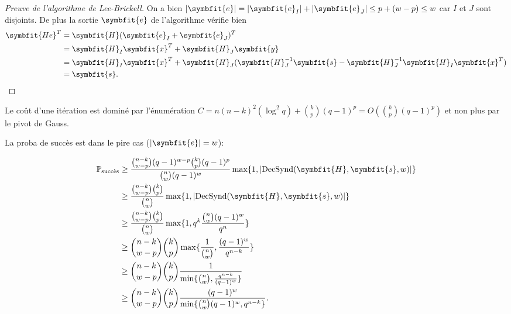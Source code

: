 \documentclass{scrartcl}[a4paper,9pt,headings=small,footinclude=false]
\theoremstyle{definition}
\theoremstyle{remark}
\begin{document}
\begin{proof}[Preuve de l'algorithme de Lee-Brickell]
On a bien $|\symbfit{e}|=|\symbfit{e}_I|+|\symbfit{e}_J|\leq p + (w - p)\leq w$ car $I$ et $J$ sont disjoints.
De plus la sortie $\symbfit{e}$ de l'algorithme vérifie bien
\begin{align*}
    \symbfit{He}^T &= \symbfit{H}(\symbfit{e}_I+\symbfit{e}_J)^T\\
    &= \symbfit{H}_I \symbfit{x}^T + \symbfit{H}_J \symbfit{y}\\
    &= \symbfit{H}_I \symbfit{x}^T + \symbfit{H}_J (\symbfit{H}_J^{-1}\symbfit{s} - \symbfit{H}_J^{-1}\symbfit{H}_I\symbfit{x}^T)\\
    &= \symbfit{s}.
\end{align*}
\end{proof}

Le coût d'une itération est dominé par l'énumération $C=n(n-k)^2(\log^2 q) + \binom{k}{p}(q-1)^p=O(\binom{k}{p}(q-1)^p)$ et non plus par le pivot de Gauss. 


La proba de succès est dans le pire cas ($|\symbfit{e}|=w$):

\begin{align*}
\mathbb{P}_{\text{succès}} &\geq  \frac{\binom{n-k}{w-p}(q-1)^{w-p} \binom{k}{p}(q-1)^{p}}{\binom{n}{w}(q-1)^w} \max \{ 1, |\text{DecSynd}(\symbfit{H},\symbfit{s},w)|\}\\
&\geq  \frac{\binom{n-k}{w-p} \binom{k}{p}}{\binom{n}{w}} \max \{ 1, |\text{DecSynd}(\symbfit{H},\symbfit{s},w)|\}\\
&\geq  \frac{\binom{n-k}{w-p} \binom{k}{p}}{\binom{n}{w}} \max \{ 1, q^k \frac{\binom{n}{w}(q-1)^w}{q^n}\}\\
&\geq  \binom{n-k}{w-p} \binom{k}{p} \max \{ \frac{1}{\binom{n}{w}}, \frac{(q-1)^w}{q^{n-k}}\}\\
&\geq  \binom{n-k}{w-p} \binom{k}{p} \frac{1}{\min \{ \binom{n}{w}, \frac{q^{n-k}}{(q-1)^w}\}}\\
&\geq  \binom{n-k}{w-p} \binom{k}{p} \frac{(q-1)^w}{\min \{ \binom{n}{w}(q-1)^w, q^{n-k}\}}.
\end{align*}
\end{document}
